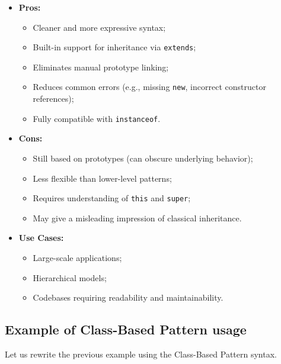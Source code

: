 \documentclass{scrbook}
\begin{document}
\begin{itemize}
    \item
        \textbf{Pros:}
        \begin{itemize}
            \item Cleaner and more expressive syntax;
            \item Built-in support for inheritance via \texttt{extends};
            \item Eliminates manual prototype linking;
            \item Reduces common errors (e.g., missing \texttt{new}, incorrect constructor references);
            \item Fully compatible with \texttt{instanceof}.
        \end{itemize}
    
    \item
        \textbf{Cons:}
        \begin{itemize}
            \item Still based on prototypes (can obscure underlying behavior);
            \item Less flexible than lower-level patterns;
            \item Requires understanding of \texttt{this} and \texttt{super};
            \item May give a misleading impression of classical inheritance.
        \end{itemize}
    
    \item
        \textbf{Use Cases:}
        \begin{itemize}
            \item Large-scale applications;
            \item Hierarchical models;
            \item Codebases requiring readability and maintainability.
        \end{itemize}
\end{itemize}

\subsection{Example of Class-Based Pattern usage}

Let us rewrite the previous example using the Class-Based Pattern syntax.
\end{document}
